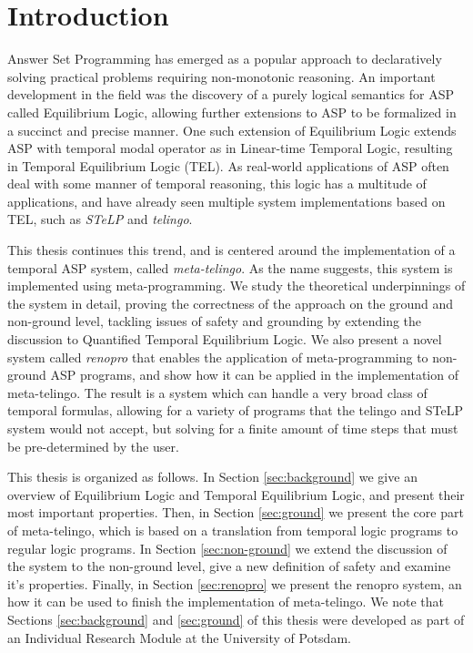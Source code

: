 \section{Introduction   }
\label{sec:introduction}

Answer Set Programming\cite{martru99a}\cite{niemela99a} has emerged as
a popular approach to declaratively solving practical problems
requiring non-monotonic reasoning. An important development in the
field was the discovery of a purely logical semantics for ASP called
Equilibrium Logic\cite{pearce06a}, allowing further extensions to ASP
to be formalized in a succinct and precise manner. One such extension
of Equilibrium Logic extends ASP with temporal modal operator as in
Linear-time Temporal Logic\cite{pnueli77a}, resulting in Temporal
Equilibrium Logic (TEL)\cite{cabveg07a}. As real-world applications of
ASP often deal with some manner of temporal reasoning, this logic has
a multitude of applications, and have already seen multiple system
implementations based on TEL, such as \emph{STeLP}\cite{cabdie11a} and
\emph{telingo}\cite{cakamosc19a}.

This thesis continues this trend, and is centered around the
implementation of a temporal ASP system, called
\emph{meta-telingo}. As the name suggests, this system is implemented
using meta-programming. We study the theoretical underpinnings of the
system in detail, proving the correctness of the approach on the
ground and non-ground level, tackling issues of safety and grounding
by extending the discussion to Quantified Temporal Equilibrium
Logic\cite{agcapevidi17a}. We also present a novel system called
\emph{renopro} that enables the application of meta-programming to
non-ground ASP programs, and show how it can be applied in the
implementation of meta-telingo. The result is a system which can
handle a very broad class of temporal formulas, allowing for a variety
of programs that the telingo and STeLP system would not accept, but
solving for a finite amount of time steps that must be pre-determined by the
user.

This thesis is organized as follows. In Section \ref{sec:background}
we give an overview of Equilibrium Logic and Temporal Equilibrium
Logic, and present their most important properties. Then, in Section
\ref{sec:ground} we present the core part of meta-telingo, which is
based on a translation from temporal logic programs to regular logic
programs. In Section \ref{sec:non-ground} we extend the discussion of
the system to the non-ground level, give a new definition of safety
and examine it's properties. Finally, in Section \ref{sec:renopro} we
present the renopro system, an how it can be used to finish the
implementation of meta-telingo. We note that Sections
\ref{sec:background} and \ref{sec:ground} of this thesis were
developed as part of an Individual Research Module at the University
of Potsdam.
